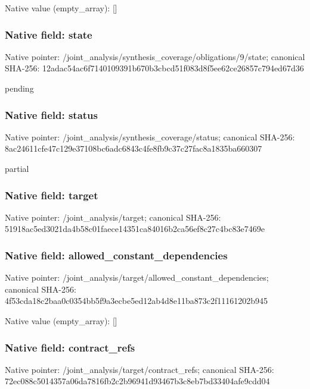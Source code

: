 \documentclass[10pt,a4paper]{article}
\begin{document}
Native value (empty\_\allowbreak{}array): []

\subsubsection{Native field: state}
Native pointer: /joint\_\allowbreak{}analysis/synthesis\_\allowbreak{}coverage/obligations/9/state; canonical SHA-256: 12adac54ac6f7140109391b670b3cbcd51f083d8f5ee62ce26857c794ed67d36

\begingroup\raggedright\sloppy pending\par\endgroup

\subsubsection{Native field: status}
Native pointer: /joint\_\allowbreak{}analysis/synthesis\_\allowbreak{}coverage/status; canonical SHA-256: 8ac24611cfe47c129e37108bc6adc6843c4fe8fb9c37c27fac8a1835ba660307

\begingroup\raggedright\sloppy partial\par\endgroup

\subsubsection{Native field: target}
Native pointer: /joint\_\allowbreak{}analysis/target; canonical SHA-256: 51918ac5ed3021da4b58c01faece14351ca84016b2ca56ef8c27c4bc83e7469e

\subsubsection{Native field: allowed\_\allowbreak{}constant\_\allowbreak{}dependencies}
Native pointer: /joint\_\allowbreak{}analysis/target/allowed\_\allowbreak{}constant\_\allowbreak{}dependencies; canonical SHA-256: 4f53cda18c2baa0c0354bb5f9a3ecbe5ed12ab4d8e11ba873c2f11161202b945

Native value (empty\_\allowbreak{}array): []

\subsubsection{Native field: contract\_\allowbreak{}refs}
Native pointer: /joint\_\allowbreak{}analysis/target/contract\_\allowbreak{}refs; canonical SHA-256: 72ec088c5014357a06da7816fb2c2b96941d93467b3c8eb7bd33404afe9cdd04
\end{document}
